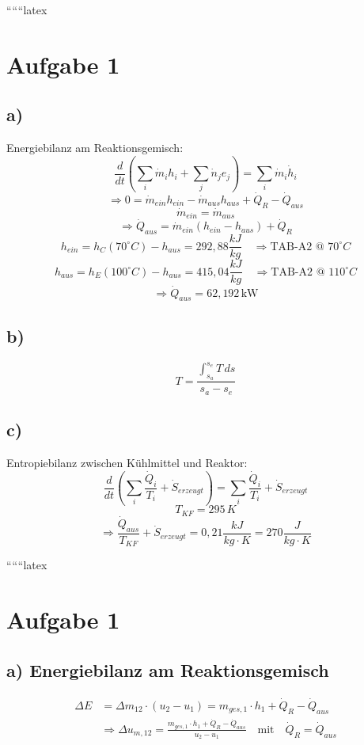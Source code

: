 
``````latex


\section*{Aufgabe 1}

\subsection*{a)}
Energiebilanz am Reaktionsgemisch:
\[
\frac{d}{dt} \left( \sum_i \dot{m}_i h_i + \sum_j \dot{n}_j e_j \right) = \sum_i \dot{m}_i \dot{h}_i
\]
\[
\Rightarrow 0 = \dot{m}_{ein} h_{ein} - \dot{m}_{aus} h_{aus} + \dot{Q}_R - \dot{Q}_{aus}
\]
\[
\dot{m}_{ein} = \dot{m}_{aus}
\]
\[
\Rightarrow \dot{Q}_{aus} = \dot{m}_{ein} (h_{ein} - h_{aus}) + \dot{Q}_R
\]
\[
h_{ein} = h_C (70^\circ C) - h_{aus} = 292,88 \frac{kJ}{kg} \quad \Rightarrow \text{TAB-A2 @ 70}^\circ C
\]
\[
h_{aus} = h_E (100^\circ C) - h_{aus} = 415,04 \frac{kJ}{kg} \quad \Rightarrow \text{TAB-A2 @ 110}^\circ C
\]
\[
\Rightarrow \dot{Q}_{aus} = 62,192 \, \text{kW}
\]

\subsection*{b)}
\[
T = \frac{\int_{s_a}^{s_e} T \, ds}{s_a - s_e}
\]

\subsection*{c)}
Entropiebilanz zwischen Kühlmittel und Reaktor:
\[
\frac{d}{dt} \left( \sum_i \frac{\dot{Q}_i}{T_i} + \dot{S}_{erzeugt} \right) = \sum_i \frac{\dot{Q}_i}{T_i} + \dot{S}_{erzeugt}
\]
\[
T_{KF} = 295 \, K
\]
\[
\Rightarrow \frac{\dot{Q}_{aus}}{T_{KF}} + \dot{S}_{erzeugt} = 0,21 \frac{kJ}{kg \cdot K} = 270 \frac{J}{kg \cdot K}
\]

``````latex


\section*{Aufgabe 1}

\subsection*{a) Energiebilanz am Reaktionsgemisch}

\begin{align*}
\Delta E &= \Delta m_{12} \cdot (u_2 - u_1) = m_{ges,1} \cdot h_1 + \dot{Q}_R - \dot{Q}_{aus} \\
&\Rightarrow \Delta u_{m,12} = \frac{m_{ges,1} \cdot h_1 + \dot{Q}_R - \dot{Q}_{aus}}{u_2 - u_1} \quad \text{mit} \quad \dot{Q}_R = \dot{Q}_{aus}
\end{align*}

